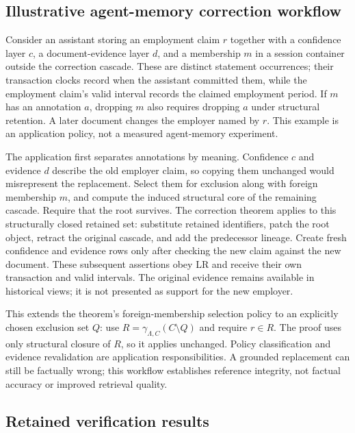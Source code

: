 \documentclass[11pt]{article}
\theoremstyle{plain}
\theoremstyle{definition}
\theoremstyle{remark}
\newcommand{\core}{\gamma}               %
\newcommand{\Lin}{\Lambda}               %
\begin{document}
\subsection{Illustrative agent-memory correction workflow}

Consider an assistant storing an employment claim $r$ together with a
confidence layer $c$, a document-evidence layer $d$, and a membership $m$ in a
session container outside the correction cascade. These are distinct statement
occurrences; their transaction clocks record when the assistant committed them,
while the employment claim's valid interval records the claimed employment period.
If $m$ has an annotation $a$, dropping $m$ also requires dropping $a$ under
structural retention. A later document changes the employer named by $r$.
This example is an application policy, not a measured agent-memory experiment.

The application first separates annotations by meaning. Confidence $c$ and
evidence $d$ describe the old employer claim, so copying them unchanged would
misrepresent the replacement. Select them for exclusion along with foreign
membership $m$, and compute the induced structural core of the remaining
cascade. Require that the root survives. The correction theorem applies to this
structurally closed retained set: substitute retained identifiers, patch the
root object, retract the original cascade, and add the predecessor lineage.
Create fresh confidence and evidence rows only after checking the new claim
against the new document. These subsequent assertions obey LR and receive their
own transaction and valid intervals. The original evidence remains available
in historical views; it is not presented as support for the new employer.

This extends the theorem's foreign-membership selection policy to an explicitly
chosen exclusion set $Q$: use
$R=\core_{\Lin,C}(C\setminus Q)$ and require $r\in R$.
The proof uses only structural closure of $R$, so it applies unchanged.
Policy classification and evidence revalidation are application responsibilities.
A grounded replacement can still be factually wrong; this workflow establishes
reference integrity, not factual accuracy or improved retrieval quality.

\subsection{Retained verification results}
\end{document}
